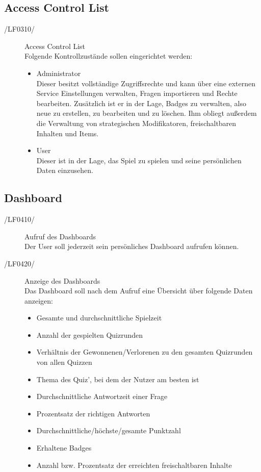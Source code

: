 \documentclass[11pt,a4paper]{scrreprt}
\begin{document}
\subsection{Access Control List}
\begin{description}
\item[/LF0310/] Access Control List \\
Folgende Kontrollzustände sollen eingerichtet werden:
	\begin{itemize}
	\item Administrator \\
	Dieser besitzt vollständige Zugriffsrechte und kann über eine externen Service Einstellungen verwalten, Fragen 				importieren und Rechte bearbeiten. Zusätzlich ist er in der Lage, Badges zu verwalten, also neue zu erstellen, zu 				bearbeiten und zu löschen. Ihm obliegt außerdem die Verwaltung von strategischen Modifikatoren, freischaltbaren 			Inhalten und Items.
	\item User \\
	Dieser ist in der Lage, das Spiel zu spielen und seine persönlichen Daten einzusehen.
	\end{itemize}

\end{description}

\subsection{Dashboard}
\begin{description}
\item[/LF0410/] Aufruf des Dashboards \\
Der User soll jederzeit sein persönliches Dashboard aufrufen können.

\item[/LF0420/] Anzeige des Dashboards  \\
Das Dashboard soll nach dem Aufruf eine Übersicht über folgende Daten anzeigen:
\begin{itemize}
	\item Gesamte und durchschnittliche Spielzeit
	\item Anzahl der gespielten Quizrunden
	\item Verhältnis der Gewonnenen/Verlorenen zu den gesamten Quizrunden von allen Quizzen
	\item Thema des Quiz', bei dem der Nutzer am besten ist
	\item Durchschnittliche Antwortzeit einer Frage
	\item Prozentsatz der richtigen Antworten
	\item Durchschnittliche/höchste/gesamte Punktzahl
	\item Erhaltene Badges
	\item Anzahl bzw. Prozentsatz der erreichten freischaltbaren Inhalte
\end{itemize}

\end{description}
\end{document}
